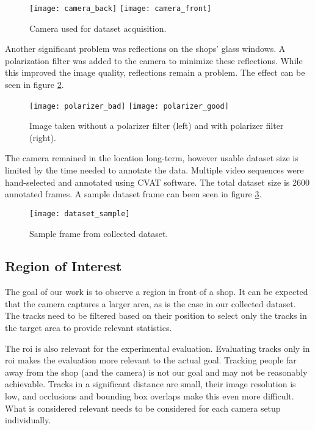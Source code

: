 \begin{figure}[ht]
    \centering
    \texttt{[image: camera\_back]}
    \texttt{[image: camera\_front]}
    \caption{Camera used for dataset acquisition.}
    \label{fig:camera}
\end{figure}

Another significant problem was reflections on the shops' glass windows. A polarization filter was added to the camera to minimize these reflections. While this improved the image quality, reflections remain a problem. The effect can be seen in figure \ref{fig:polarizer}.

\begin{figure}[ht]
    \centering
    \texttt{[image: polarizer\_bad]}
    \texttt{[image: polarizer\_good]}
    \caption[Image taken without a polarizer filter and with polarizer filter.]{Image taken without a polarizer filter (left) and with polarizer filter (right).}
    \label{fig:polarizer}
\end{figure}

The camera remained in the location long-term, however usable dataset size is limited by the time needed to annotate the data. Multiple video sequences were hand-selected and annotated using CVAT software\cite{cvat}. The total dataset size is 2600 annotated frames. A sample dataset frame can been seen in figure \ref{fig:dataset_sample}.

\begin{figure}[ht]
    \centering
    \texttt{[image: dataset\_sample]}
    \caption{Sample frame from collected dataset.}
    \label{fig:dataset_sample}
\end{figure}

\subsection{Region of Interest}

The goal of our work is to observe a region in front of a shop. It can be expected that the camera captures a larger area, as is the case in our collected dataset. The tracks need to be filtered based on their position to select only the tracks in the target area to provide relevant statistics.

The \gls{roi} is also relevant for the experimental evaluation. Evaluating tracks only in \gls{roi} makes the evaluation more relevant to the actual goal. Tracking people far away from the shop (and the camera) is not our goal and may not be reasonably achievable. Tracks in a significant distance are small, their image resolution is low, and occlusions and bounding box overlaps make this even more difficult. What is considered relevant needs to be considered for each camera setup individually.

